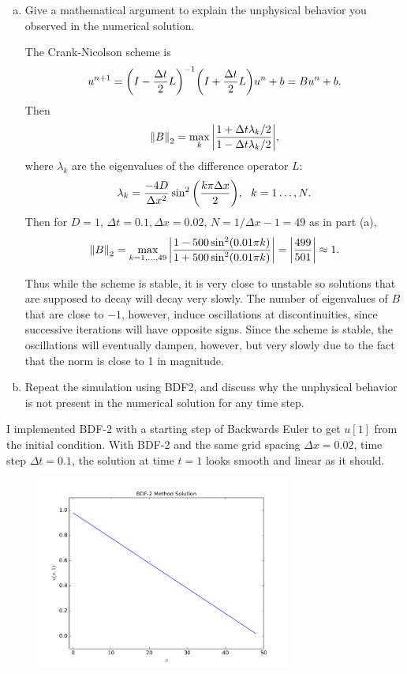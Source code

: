 \documentclass[12pt]{article}
\begin{document}
\begin{enumerate}[(a)]
\item Give a mathematical argument to explain the unphysical behavior you observed in the numerical solution.

The Crank-Nicolson scheme is
$$u^{n+1} = \qty(I - \dfrac{\Delta t}{2} L )^{-1}\qty(I + \dfrac{\Delta t}{2} L ) u^{n} + b = B u^{n} + b.$$
Then $$\norm{B}_2 = \max_k \abs{\dfrac{1+\Delta t \lambda_k /2}{1 - \Delta t \lambda_k /2}},$$
where $\lambda_k$ are the eigenvalues of the difference operator $L$:
$$\lambda_k = \dfrac{-4D}{\Delta x^2} \sin^2\qty(\dfrac{k\pi\Delta x}{2}), \ \ k=1\dots, N.$$
Then for $D=1$, $\Delta t=0.1, \Delta x = 0.02$, $N=1/\Delta x -1 = 49$ as in part (a),
$$\norm{B}_2 = \max_{k=1,\dots,49} \abs{\dfrac{1-500\sin^2(0.01\pi k)}{1+500\sin^2(0.01\pi k)}} = \abs{\dfrac{499}{501}} \approx 1.$$

Thus while the scheme is stable, it is very close to unstable so solutions that are supposed to decay will decay very slowly. The number of eigenvalues of $B$ that are close to $-1$, however, induce oscillations at discontinuities, since successive iterations will have opposite signs.  Since the scheme is stable, the oscillations will eventually dampen, however, but very slowly due to the fact that the norm is close to 1 in magnitude.

\newpage

\item Repeat the simulation using BDF2, and discuss why the unphysical behavior is not present in the numerical solution for any time step.
\end{enumerate}

I implemented BDF-2 with a starting step of Backwards Euler to get $u[1]$ from the initial condition.  With BDF-2 and the same grid spacing $\Delta x = 0.02$, time step $\Delta t = 0.1$, the solution at time $t=1$ looks smooth and linear as it should.

\begin{figure}[H]
\centering\includegraphics[width=0.75\textwidth]{problem3_bdf2_fixedissue.png}
\end{figure}
\end{document}
